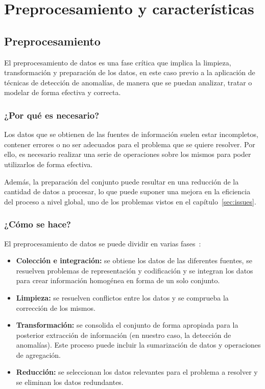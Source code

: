 \chapter{Preprocesamiento y características}
\section{Preprocesamiento}\label{sec:pre}
El preprocesamiento de datos es una fase crítica que implica la limpieza,
transformación y preparación de los datos, en este caso previo a la aplicación
de técnicas de detección de anomalías, de manera que se puedan analizar, tratar
o modelar de forma efectiva y correcta.

\nocite{herrera2004pre}
\subsection{¿Por qué es necesario?}
Los datos que se obtienen de las fuentes de información suelen estar incompletos,
contener errores o no ser adecuados para el problema que se quiere resolver.
Por ello, es necesario realizar una serie de operaciones sobre los mismos para
poder utilizarlos de forma efectiva.

Además, la preparación del conjunto puede resultar en una reducción de la cantidad
de datos a procesar, lo que puede suponer una mejora en la eficiencia del proceso
a nivel global, uno de los problemas vistos en el capítulo~\ref{sec:issues}.

\subsection{¿Cómo se hace?}
El preprocesamiento de datos se puede dividir en varias fases~\cite{zhang2003data}:

\begin{itemize}[topsep=0pt]
	\item \textbf{Colección e integración:} se obtiene los datos de las diferentes fuentes, se
		resuelven problemas de representación y codificación y se integran los datos para crear
		información homogénea en forma de un solo conjunto.~\cite{detours2003integration}
	\item \textbf{Limpieza:} se resuelven conflictos entre los datos y se comprueba la corrección
		de los mismos.~\cite{kim2003taxonomy}
	\item \textbf{Transformación:} se consolida el conjunto de forma apropiada para la posterior
		extracción de información (en nuestro caso, la detección de anomalías). Este proceso puede
		incluir la sumarización de datos y operaciones de agregación.~\cite{lin2002attribute}
	\item \textbf{Reducción:} se seleccionan los datos relevantes para el problema a resolver y se
		eliminan los datos redundantes.~\cite{liu2012feature}
\end{itemize}

